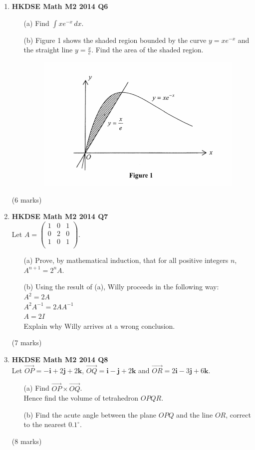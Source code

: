 \documentclass[12pt]{article}
\begin{document}
\begin{enumerate}
	\item \textbf{HKDSE Math M2 2014 Q6}
	\begin{enumerate}
		\item [(a)]Find $\displaystyle\int xe^{-x}\,dx$. 
		\item [(b)]	Figure 1 shows the shaded region bounded by the curve $y = xe^{-x}$ and the straight line $y = \displaystyle\frac{x}{e}$. Find the area of the shaded region.
		\begin{figure}[H]
			\centering
			\includegraphics[width = .5\linewidth]{2014Figure1}
		\end{figure}

	\end{enumerate}
	(6 marks)

	\item \textbf{HKDSE Math M2 2014 Q7}\\
	Let $A = \begin{pmatrix}
		1&0&1\\
		0&2&0\\
		1&0&1\\
	\end{pmatrix}$.
	\begin{enumerate}
		\item [(a)]Prove, by mathematical induction, that for all positive integers $n$, $A^{n+1} = 2^nA$. 
		\item [(b)]Using the result of (a), Willy proceeds in the following way:\\
			$A^2 = 2A$\\
			$A^2 A^{-1}= 2AA^{-1}$\\
			$A = 2I$\\
			Explain why Willy arrives at a wrong conclusion.
	\end{enumerate}
	(7 marks)

	\item \textbf{HKDSE Math M2 2014 Q8}\\
	Let 
	$\overrightarrow{OP} = -\textbf{i} +2 \textbf{j} +2\textbf {k}$, 
	$\overrightarrow{OQ} = \textbf{i} - \textbf{j} +2\textbf {k}$ and 
	$\overrightarrow{OR} = 2\textbf{i} -3 \textbf{j} +6\textbf {k}$. 
	\begin{enumerate}
		\item [(a)]Find $\overrightarrow{OP} \times \overrightarrow{OQ}$. \\
		Hence find the volume of tetrahedron $OPQR$. 
		\item [(b)]Find the acute angle between the plane $OPQ$ and the line $OR$, correct to the nearest $0.1^\circ$.
	\end{enumerate}
	(8 marks)


\end{enumerate}
\end{document}

